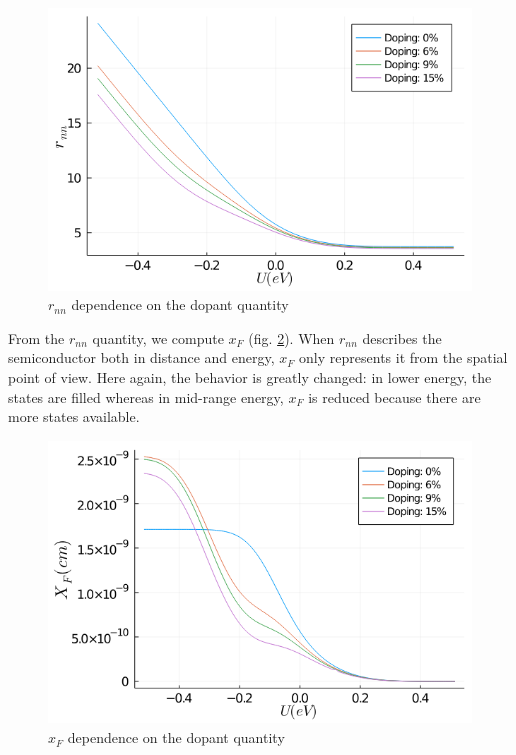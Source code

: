 \begin{figure}[!h]
    \centering
    \includegraphics*[width=.5\paperwidth]{figures/4_thermal/rnn_doped.png}
    \caption{$r_{nn}$ dependence on the dopant quantity\label{fig:4_2}}
\end{figure}

\vspace{1em}

From the $r_{nn}$ quantity, we compute $x_F$ (fig. \ref{fig:4_3}). When $r_{nn}$ describes the semiconductor both in distance and energy, $x_F$ only represents it from the spatial point of view. Here again, the behavior is greatly changed: in lower energy, the states are filled whereas in mid-range energy, $x_F$ is reduced because there are more states available.

\begin{figure}[!h]
    \centering
    \includegraphics*[width=.5\paperwidth]{figures/4_thermal/xf_doped.png}
    \caption{$x_F$ dependence on the dopant quantity\label{fig:4_3}}
\end{figure}

